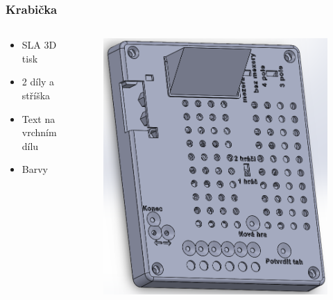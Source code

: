 \documentclass[%
  12pt,       				%
	t,                  %
	aspectratio=1610,   %
	unicode,						%
]{beamer}				    	%
\begin{document}
\begin{frame} 
	\frametitle{Krabička}
	\begin{columns}[T] 								%
		\begin{column}{0.4\textwidth}		%
			\vspace{0.5cm}
			\begin{itemize}
				\item SLA 3D tisk
				\item 2 díly a stříška
				\item Text na vrchním dílu
				\item Barvy
			\end{itemize}
		\end{column}
		\begin{column}{0.6\textwidth}		%
			\begin{figure}%
				\centering
				\includegraphics[width=0.7\columnwidth]{prilohy/Krabicka_SolidWorks.png}
			\end{figure}
		\end{column}
	\end{columns}	
\end{frame}
\end{document}
